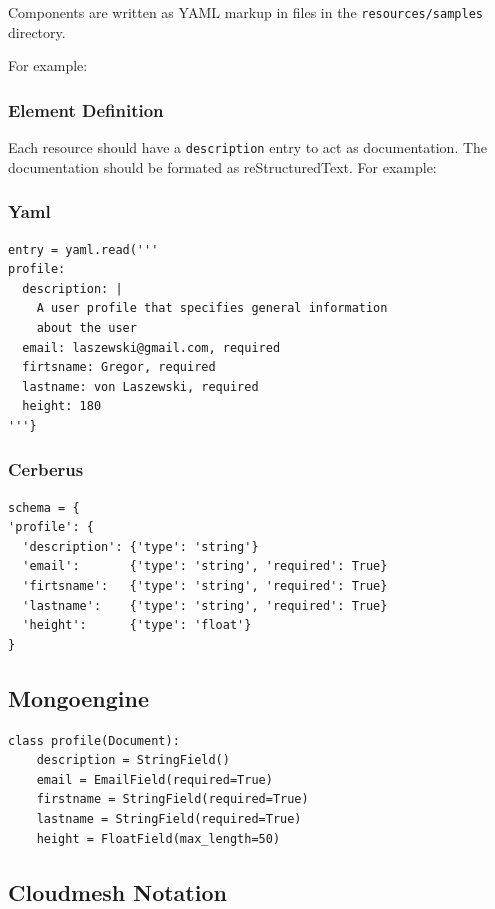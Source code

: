 \documentclass[10pt]{article}
\begin{document}
Components are written as YAML markup in files in the
\verb+resources/samples+ directory.

For example:


\subsubsection{Element Definition}

Each resource should have a \verb+description+ entry to act as
documentation. The documentation should be formated as
reStructuredText. For example:

\subsubsection{Yaml}

\begin{Verbatim}
entry = yaml.read('''
profile:
  description: |
    A user profile that specifies general information 
    about the user
  email: laszewski@gmail.com, required
  firtsname: Gregor, required
  lastname: von Laszewski, required
  height: 180
'''}
\end{Verbatim}

\subsubsection{Cerberus}

\begin{Verbatim}
schema = {
'profile': {
  'description': {'type': 'string'}
  'email':       {'type': 'string', 'required': True}
  'firtsname':   {'type': 'string', 'required': True}
  'lastname':    {'type': 'string', 'required': True}
  'height':      {'type': 'float'}
}
\end{Verbatim}

\subsection{Mongoengine}

\begin{Verbatim}
class profile(Document):
    description = StringField()
    email = EmailField(required=True)
    firstname = StringField(required=True)
    lastname = StringField(required=True)
    height = FloatField(max_length=50)
\end{Verbatim}

\subsection{Cloudmesh Notation}
\end{document}
